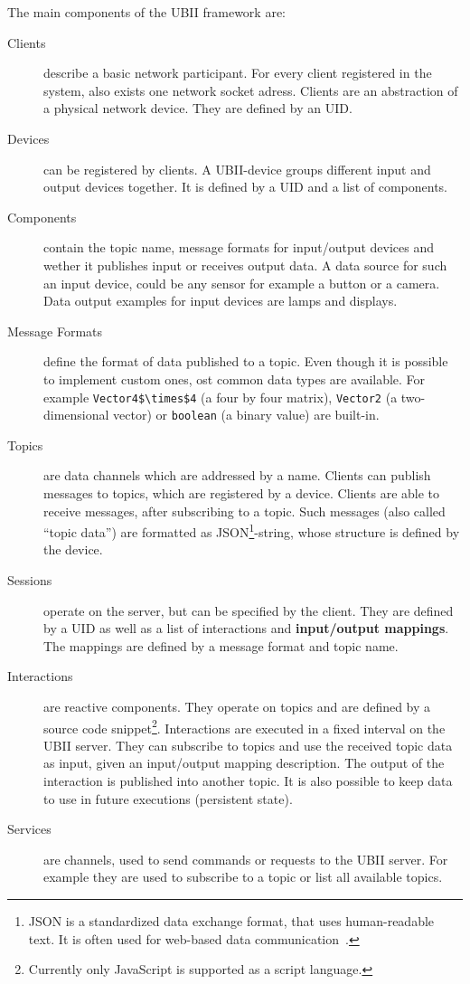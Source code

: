 The main components of the \ac{UBII} framework are:
\begin{description}
	\item[Clients] describe a basic network participant. For every client registered in the system, also exists one network socket adress. Clients are an abstraction of a physical network device. They are defined by an \ac{UID}. 
	\item[Devices] can be registered by clients. A \ac{UBII}-device groups different input and output devices together. It is defined by a \ac{UID} and a list of components.
  \item[Components] contain the topic name, message formats for input/output devices and wether it publishes input or receives output data. A data source for such an input device, could be any sensor for example a button or a camera. Data output examples for input devices are lamps and displays.
  \item[Message Formats] define the format of data published to a topic. Even though it is possible to implement custom ones, ost common data types are available. For example \lstinline[mathescape=true]{Vector4$\times$4} (a four by four matrix), \lstinline{Vector2} (a two-dimensional vector) or \lstinline{boolean} (a binary value) are built-in.
	\item[Topics] are data channels which are addressed by a name. Clients can publish messages to topics, which are registered by a device. Clients are able to receive messages, after subscribing to a topic. Such messages (also called \enquote{topic data}) are formatted as JSON\footnote{JSON is a standardized data exchange format, that uses human-readable text. It is often used for web-based data communication~\cite[iii]{ECMAInternational.2017}.}-string, whose structure is defined by the device.
	\item[Sessions] operate on the server, but can be specified by the client. They are defined by a \ac{UID} as well as a list of interactions and \textbf{input/output mappings}. The mappings are defined by a message format and topic name.
	\item[Interactions] are reactive components. They operate on topics and are defined by a source code snippet\footnote{Currently only JavaScript is supported as a script language.}. Interactions are executed in a fixed interval on the \ac{UBII} server. They can subscribe to topics and use the received topic data as input, given an input/output mapping description. The output of the interaction is published into another topic. It is also possible to keep data to use in future executions (persistent state).
	\item[Services] are channels, used to send commands or requests to the \ac{UBII} server. For example they are used to subscribe to a topic or list all available topics.
\end{description}

